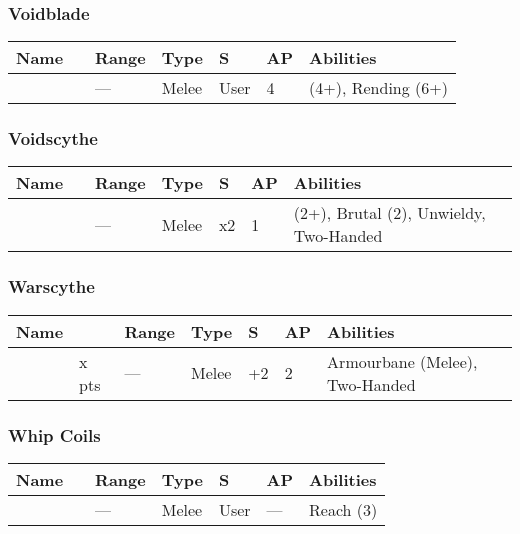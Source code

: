 \subsubsection{Voidblade} \label{Voidblade}
\noindent
\begin{tabular}{||m{110pt} m{30pt} m{31pt} m{55pt} m{12pt} m{12pt} m{210pt}||}
	\hline
	Name & & Range & Type & S & AP & Abilities \\
	\hline
	\quickref{Voidblade} &  & — & Melee & User & 4 & \quickref{Entropic Strike} (4+), Rending (6+) \\
	\hline
\end{tabular}

\subsubsection{Voidscythe} \label{Voidscythe}
\noindent
\begin{tabular}{||m{110pt} m{30pt} m{31pt} m{55pt} m{12pt} m{12pt} m{210pt}||}
	\hline
	Name & & Range & Type & S & AP & Abilities \\
	\hline
	\quickref{Voidscythe} &  & — & Melee & x2 & 1 & \quickref{Entropic Strike} (2+), Brutal (2), Unwieldy, Two-Handed \\
	\hline
\end{tabular}

\subsubsection{Warscythe}
\label{Warscythe}
\noindent
\begin{tabular}{||m{110pt} m{30pt} m{31pt} m{55pt} m{12pt} m{12pt} m{210pt}||}
	\hline
	Name & & Range & Type & S & AP & Abilities \\
	\hline
	\quickref{Warscythe} & x pts& — & Melee & +2 & 2 & Armourbane (Melee), Two-Handed \\
	\hline
\end{tabular}

\subsubsection{Whip Coils}
\label{Whip Coils}
\noindent
\begin{tabular}{||m{110pt} m{30pt} m{31pt} m{55pt} m{12pt} m{12pt} m{210pt}||}
	\hline
	Name & & Range & Type & S & AP & Abilities \\
	\hline
	\quickref{Whip Coils} & & — & Melee & User & — & Reach (3) \\
	\hline
\end{tabular}



